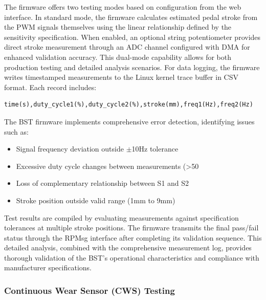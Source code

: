 \documentclass[12pt]{article}
\begin{document}
The firmware offers two testing modes based on configuration from the web interface. In standard mode, the firmware calculates estimated pedal stroke from the PWM signals themselves using the linear relationship defined by the sensitivity specification. When enabled, an optional string potentiometer provides direct stroke measurement through an ADC channel configured with DMA for enhanced validation accuracy. This dual-mode capability allows for both production testing and detailed analysis scenarios.
For data logging, the firmware writes timestamped measurements to the Linux kernel trace buffer in CSV format. Each record includes:
\begin{verbatim}
time(s),duty_cycle1(%),duty_cycle2(%),stroke(mm),freq1(Hz),freq2(Hz)
\end{verbatim}
The BST firmware implements comprehensive error detection, identifying issues such as:
\begin{itemize}
\item Signal frequency deviation outside $\pm$10Hz tolerance
\item Excessive duty cycle changes between measurements (>50%
\item Loss of complementary relationship between S1 and S2
\item Stroke position outside valid range (1mm to 9mm)
\end{itemize}
Test results are compiled by evaluating measurements against specification tolerances at multiple stroke positions. The firmware transmits the final pass/fail status through the RPMsg interface after completing its validation sequence. This detailed analysis, combined with the comprehensive measurement log, provides thorough validation of the BST's operational characteristics and compliance with manufacturer specifications.

\subsubsection{Continuous Wear Sensor (CWS) Testing}
\end{document}
